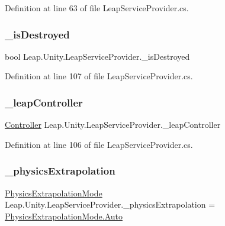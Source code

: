 Definition at line 63 of file Leap\+Service\+Provider.\+cs.

\mbox{\label{class_leap_1_1_unity_1_1_leap_service_provider_a8e1a44556c88725caaaafa35e0991d78}} 
\subsubsection{\texorpdfstring{\_isDestroyed}{\_isDestroyed}}
{\footnotesize\ttfamily bool Leap.\+Unity.\+Leap\+Service\+Provider.\+\_\+is\+Destroyed\hspace{0.3cm}{\ttfamily [protected]}}



Definition at line 107 of file Leap\+Service\+Provider.\+cs.

\mbox{\label{class_leap_1_1_unity_1_1_leap_service_provider_a81109a7f1bd8d6fb195fb31e5c85fad3}} 
\subsubsection{\texorpdfstring{\_leapController}{\_leapController}}
{\footnotesize\ttfamily \mbox{\hyperlink{class_leap_1_1_controller}{Controller}} Leap.\+Unity.\+Leap\+Service\+Provider.\+\_\+leap\+Controller\hspace{0.3cm}{\ttfamily [protected]}}



Definition at line 106 of file Leap\+Service\+Provider.\+cs.

\mbox{\label{class_leap_1_1_unity_1_1_leap_service_provider_ad27fe97e7347f34807b34374b0cea29c}} 
\subsubsection{\texorpdfstring{\_physicsExtrapolation}{\_physicsExtrapolation}}
{\footnotesize\ttfamily \mbox{\hyperlink{class_leap_1_1_unity_1_1_leap_service_provider_a2ce142abf998f86ac23b3d30032ea82e}{Physics\+Extrapolation\+Mode}} Leap.\+Unity.\+Leap\+Service\+Provider.\+\_\+physics\+Extrapolation = \mbox{\hyperlink{class_leap_1_1_unity_1_1_leap_service_provider_a2ce142abf998f86ac23b3d30032ea82ea06b9281e396db002010bde1de57262eb}{Physics\+Extrapolation\+Mode.\+Auto}}\hspace{0.3cm}{\ttfamily [protected]}}



